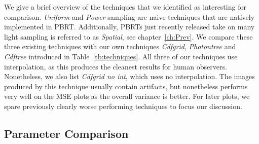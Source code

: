 We give a brief overview of the techniques that we identified as interesting for comparison. \textit{Uniform} and \textit{Power} sampling are naive techniques that are natively implemented in PBRT. Additionally, PBRTs just recently released take on many light sampling is referred to as \textit{Spatial}, see chapter~\ref{ch:Prev}. We compare these three existing techniques with our own techniques \textit{Cdfgrid}, \textit{Photontree} and \textit{Cdftree} introduced in Table~\ref{tb:techniques}. All three of our techniques use interpolation, as this produces the cleanest results for human observers. Nonetheless, we also list \textit{Cdfgrid no int}, which uses no interpolation. The images produced by this technique usually contain artifacts, but nonetheless performs very well on the MSE plots as the overall variance is better. For later plots, we spare previously clearly worse performing techniques to focus our discussion.

\subsection{Parameter Comparison}

